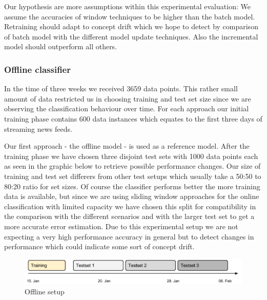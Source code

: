 \documentclass{article} %
\begin{document}
Our hypothesis are more assumptions within this experimental evaluation: We assume the accuracies of window techniques to be higher than the batch model. Retraining should adapt to concept drift which we hope to detect by comparison of batch model with the different model update techniques. Also the incremental model should outperform all others.

\subsubsection*{Offline classifier}
In the time of three weeks we received 3659 data points. This rather small amount of data restricted us in choosing training and test set size since we are observing the classification behaviour over time. For each approach our initial training phase contains 600 data instances which equates to the first three days of streaming news feeds. 

Our first approach - the offline model - is used as a reference model. After the training phase we have chosen three disjoint test sets with 1000 data points each as seen in the graphic below to retrieve possible performance changes.  Our size of training and test set differers from other test setups which usually take a 50:50 to 80:20 ratio for set sizes.  Of course the classifier performs better the more training data is available, but since we are using sliding window approaches for the online classification with limited capacity we  have chosen this split for compatibility in the comparison with the different scenarios and  with the larger test set to get a more accurate error estimation.  Due to this experimental setup we are not expecting a very high performance accuracy in general but to detect changes in performance which could indicate some sort of concept drift.
\begin{figure}[htbp]
  \centering
  \includegraphics[scale=0.28]{./time_models/OfflineModel.png}
  \caption{Offline setup}
\end{figure}
\end{document}
